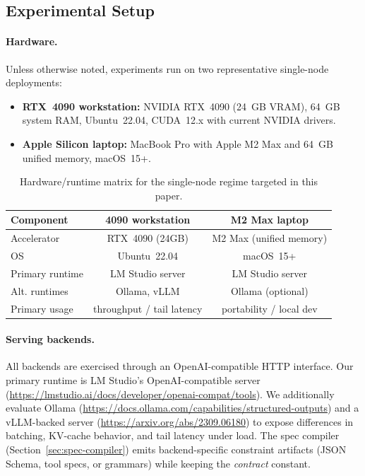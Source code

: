 \subsection{Experimental Setup}
\label{sec:setup}

\paragraph{Hardware.}
Unless otherwise noted, experiments run on two representative single-node deployments:

\begin{itemize}[leftmargin=12pt]
    \item \textbf{RTX~4090 workstation:} NVIDIA RTX~4090 (24~GB VRAM), 64~GB system RAM, Ubuntu~22.04, CUDA~12.x with current NVIDIA drivers.
    \item \textbf{Apple Silicon laptop:} MacBook Pro with Apple M2 Max and 64~GB unified memory, macOS~15+.
\end{itemize}

\begin{table}[t]
\centering
\small
\begin{tabular}{@{}lcc@{}}
\toprule
\textbf{Component} & \textbf{4090 workstation} & \textbf{M2 Max laptop} \\
\midrule
Accelerator & RTX~4090 (24GB) & M2 Max (unified memory) \\
OS & Ubuntu~22.04 & macOS~15+ \\
Primary runtime & LM Studio server & LM Studio server \\
Alt. runtimes & Ollama, vLLM & Ollama (optional) \\
Primary usage & throughput / tail latency & portability / local dev \\
\bottomrule
\end{tabular}
\caption{Hardware/runtime matrix for the single-node regime targeted in this paper.}
\label{tab:hw-matrix}
\end{table}

\paragraph{Serving backends.}
All backends are exercised through an OpenAI-compatible HTTP interface.
Our primary runtime is LM Studio’s OpenAI-compatible server (\url{https://lmstudio.ai/docs/developer/openai-compat/tools}).
We additionally evaluate Ollama (\url{https://docs.ollama.com/capabilities/structured-outputs}) and a vLLM-backed server (\url{https://arxiv.org/abs/2309.06180}) to expose differences in batching, KV-cache behavior, and tail latency under load.
The spec compiler (Section~\ref{sec:spec-compiler}) emits backend-specific constraint artifacts (JSON Schema, tool specs, or grammars) while keeping the \emph{contract} constant.

